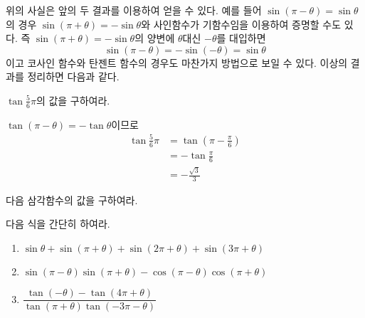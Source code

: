 \documentclass[11pt, a4paper]{book}
\begin{document}
\vspace{1em}

위의 사실은 앞의 두 결과를 이용하여 얻을 수 있다. 예를 들어 $\sin(\pi-\theta)=\sin\theta$의 경우
$\sin(\pi + \theta) = - \sin\theta$와 사인함수가 기함수임을 이용하여 증명할 수도 있다. 즉 $\sin(\pi + \theta) = - \sin\theta$의 양변에 $\theta$대신 $-\theta$를 대입하면
\[
\sin(\pi-\theta) = - \sin(-\theta) = \sin\theta
\]
이고 코사인 함수와 탄젠트 함수의 경우도 마찬가지 방법으로 보일 수 있다. 이상의 결과를 정리하면 다음과 같다.
\vspace{1em}
\begin{theorem}
	\questhree{\sin(\pi-\theta)=\sin\theta}{\cos(\pi-\theta)=-\cos\theta}{\tan(\pi-\theta)=-\tan\theta}
\end{theorem}
\vspace{1em}

\begin{example}
	$\tan \frac{5}{6}\pi$의 값을 구하여라.
	\begin{solution}
		$\tan(\pi-\theta)=-\tan \theta$이므로
		\begin{align*}
			\tan \frac{5}{6}\pi & = \tan \left(\pi- \frac{\pi}{6}\right) \\
			& = - \tan \frac{\pi}{6} \\
			& = - \frac{\sqrt{3}}{3}
		\end{align*}
	\end{solution}
\end{example}
\vspace{1em}

\begin{problem}
	다음 삼각함수의 값을 구하여라.
\end{problem}
\vspace{1em}

\begin{problem}
	다음 식을 간단히 하여라.
	\begin{enumerate}[label =(\arabic*)]
		\item $\sin\theta + \sin (\pi+\theta) + \sin(2\pi + \theta) + \sin(3\pi + \theta)$
		\item $\sin(\pi-\theta) \sin(\pi +\theta) - \cos(\pi-\theta) \cos (\pi + \theta)$
		\item $\dfrac{\tan(-\theta)-\tan(4\pi+\theta)}{\tan(\pi+\theta) \tan(-3\pi-\theta)}$
	\end{enumerate}
\end{problem}
\end{document}

